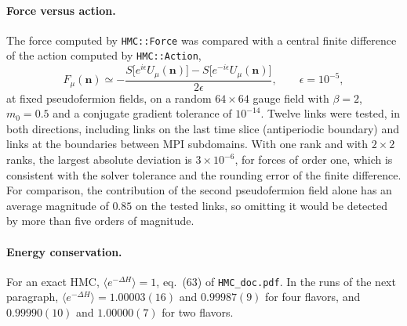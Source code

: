\documentclass[11pt,a4paper]{article}
\newcommand{\n}{\mathbf{n}}
\newcommand{\code}[1]{\texttt{#1}}
\newcommand{\hmcdoc}{\texttt{HMC\_doc.pdf}}
\begin{document}
\paragraph{Force versus action.}
The force computed by \code{HMC::Force} was compared with a central finite difference of the action computed by
\code{HMC::Action},
\begin{equation}
    F_\mu(\n) \simeq -\frac{S\bigl[e^{i\epsilon}U_\mu(\n)\bigr] - S\bigl[e^{-i\epsilon}U_\mu(\n)\bigr]}{2\epsilon},
    \qquad \epsilon = 10^{-5},
\end{equation}
at fixed pseudofermion fields, on a random $64\times64$ gauge field with $\beta = 2$, $m_0 = 0.5$ and a conjugate
gradient tolerance of $10^{-14}$. Twelve links were tested, in both directions, including links on the last time
slice (antiperiodic boundary) and links at the boundaries between MPI subdomains. With one rank and with
$2\times2$ ranks, the largest absolute deviation is $3\times10^{-6}$, for forces of order one, which is consistent
with the solver tolerance and the rounding error of the finite difference. For comparison, the contribution of the
second pseudofermion field alone has an average magnitude of $0.85$ on the tested links, so omitting it would
be detected by more than five orders of magnitude.

\paragraph{Energy conservation.}
For an exact HMC, $\langle e^{-\Delta H}\rangle = 1$, eq.~(63) of \hmcdoc. In the runs of the next paragraph,
$\langle e^{-\Delta H}\rangle = 1.00003(16)$ and $0.99987(9)$ for four flavors, and $0.99990(10)$ and $1.00000(7)$
for two flavors.
\end{document}
